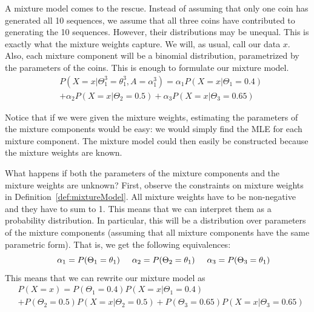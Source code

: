 A mixture model comes to the rescue. Instead of assuming that only one coin has generated all 10 sequences,
we assume that all three coins have contributed to generating the 10 sequences. However, their distributions
may be unequal. This is exactly what the mixture weights capture. We will, as usual, call our data
$ x $. Also, each mixture component will be a binomial distribution, parametrized by the parameters of
the coins. This is enough to formulate our mixture model.
\begin{align}\label{eq:mixtureExample}
&P(X=x|\Theta_{1}^{3}=\theta_{1}^{3}, A = \alpha_{1}^{3}) 
= \alpha_{1}P(X=x|\Theta_{1}=0.4) \\
&+ \alpha_{2}P(X=x|\Theta_{2}=0.5) + \alpha_{3}P(X=x|\Theta_{3}=0.65) \nonumber
\end{align}

Notice that if we were given the mixture weights, estimating
the parameters of the mixture components would be easy: we would simply find the MLE for each mixture component. The mixture
model could then easily be constructed because the mixture weights are known. 

What happens if both the parameters of the mixture components and the mixture weights are unknown? First, observe the constraints
on mixture weights in Definition~\ref{def:mixtureModel}. All mixture weights have to be non-negative and they have to sum to 1.
This means that we can interpret them as a probability distribution. In particular, this will be a distribution over parameters
of the mixture components (assuming that all mixture components have the same parametric form). That is, we get the following
equivalences:
\begin{equation}
\hskip 0.5cm \alpha_{1} = P(\Theta_{1} = \theta_{1}) \hskip 0.5cm \alpha_{2} = P(\Theta_{2} = \theta_{1}) \hskip 0.5cm \alpha_{3} = P(\Theta_{3} = \theta_{1})
\end{equation}
This means that we can rewrite our mixture model as
\begin{align} \label{eq:probabilisticMixtureModel}
&P(X=x) 
= P(\Theta_{1} = 0.4)P(X=x|\Theta_{1}=0.4) \\
&+ P(\Theta_{2} = 0.5)P(X=x|\Theta_{2}=0.5) + P(\Theta_{3} = 0.65)P(X=x|\Theta_{3}=0.65) \nonumber
\end{align}

